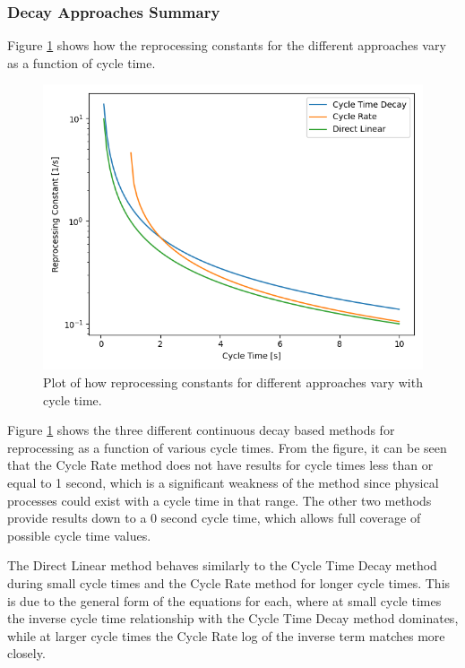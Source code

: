 \subsubsection{Decay Approaches Summary}

Figure \ref{fig:repr_cnst} shows how the reprocessing constants for the different approaches vary as a function of cycle time.

\begin{figure}[H]
  \centering
  \includegraphics[scale=0.7]{images/cont-compare-cycles.png}
  \caption{Plot of how reprocessing constants for different approaches vary with cycle time.}
   \label{fig:repr_cnst}
\end{figure}

Figure \ref{fig:repr_cnst} shows the three different continuous decay based methods for reprocessing as a function of various cycle times. From the figure, it can be seen that the Cycle Rate method does not have results for cycle times less than or equal to 1 second, which is a significant weakness of the method since physical processes could exist with a cycle time in that range. The other two methods provide results down to a 0 second cycle time, which allows full coverage of possible cycle time values.

The Direct Linear method behaves similarly to the Cycle Time Decay method during small cycle times and the Cycle Rate method for longer cycle times. This is due to the general form of the equations for each, where at small cycle times the inverse cycle time relationship with the Cycle Time Decay method dominates, while at larger cycle times the Cycle Rate log of the inverse term matches more closely.


